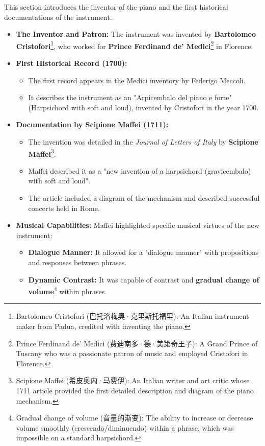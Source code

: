 \documentclass[math,code]{amznotes}
\theoremstyle{remark}
\begin{document}
This section introduces the inventor of the piano and the first historical documentations of the instrument.

\begin{itemize}
    \item \textbf{The Inventor and Patron:} The instrument was invented by \textbf{Bartolomeo Cristofori}\footnote{Bartolomeo Cristofori (巴托洛梅奥·克里斯托福里): An Italian instrument maker from Padua, credited with inventing the piano.}, who worked for \textbf{Prince Ferdinand de' Medici}\footnote{Prince Ferdinand de' Medici (费迪南多·德·美第奇王子): A Grand Prince of Tuscany who was a passionate patron of music and employed Cristofori in Florence.} in Florence.
    \item \textbf{First Historical Record (1700):}
    \begin{itemize}
        \item The first record appears in the Medici inventory by Federigo Meccoli.
        \item It describes the instrument as an "Arpicembalo del piano e forte" (Harpsichord with soft and loud), invented by Cristofori in the year 1700.
    \end{itemize}
    \item \textbf{Documentation by Scipione Maffei (1711):}
    \begin{itemize}
        \item The invention was detailed in the \textit{Journal of Letters of Italy} by \textbf{Scipione Maffei}\footnote{Scipione Maffei (希皮奥内·马费伊): An Italian writer and art critic whose 1711 article provided the first detailed description and diagram of the piano mechanism.}.
        \item Maffei described it as a "new invention of a harpsichord (gravicembalo) with soft and loud".
        \item The article included a diagram of the mechanism  and described successful concerts held in Rome.
    \end{itemize}
    \item \textbf{Musical Capabilities:} Maffei highlighted specific musical virtues of the new instrument:
    \begin{itemize}
        \item \textbf{Dialogue Manner:} It allowed for a "dialogue manner" with propositions and responses between phrases.
        \item \textbf{Dynamic Contrast:} It was capable of contrast and \textbf{gradual change of volume}\footnote{Gradual change of volume (音量的渐变): The ability to increase or decrease volume smoothly (crescendo/diminuendo) within a phrase, which was impossible on a standard harpsichord.} within phrases.
    \end{itemize}
\end{itemize}
\end{document}
